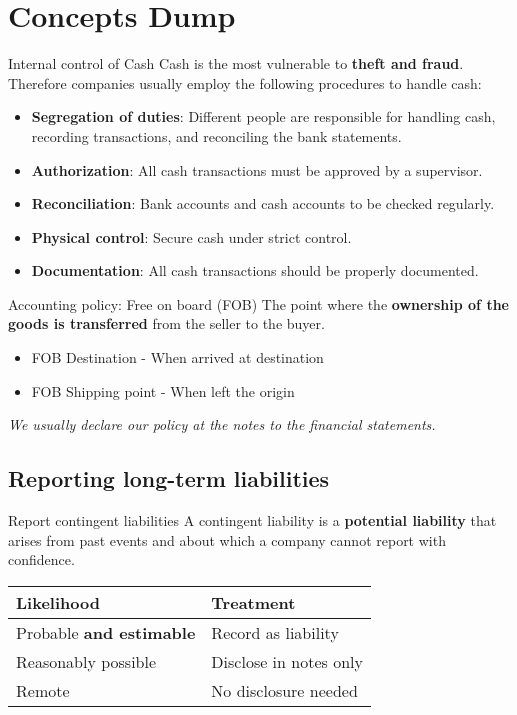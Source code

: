 \section{Concepts Dump}

\begin{theorem}
    {Internal control of Cash}
    Cash is the most vulnerable to \textbf{theft and fraud}. Therefore companies usually employ the following procedures to handle cash:
    \begin{itemize}
        \item \textbf{Segregation of duties}: Different people are responsible for handling cash, recording transactions, and reconciling the bank statements.
        \item \textbf{Authorization}: All cash transactions must be approved by a supervisor.
        \item \textbf{Reconciliation}: Bank accounts and cash accounts to be checked regularly.
        \item \textbf{Physical control}: Secure cash under strict control.
        \item \textbf{Documentation}: All cash transactions should be properly documented.
    \end{itemize}
\end{theorem}

\begin{theorem}
    {Accounting policy: Free on board (FOB)}
    The point where the \textbf{ownership of the goods is transferred} from the seller to the buyer.
    \begin{itemize}
        \item FOB Destination - When arrived at destination
        \item FOB Shipping point - When left the origin
    \end{itemize}
    \textit{We usually declare our policy at the notes to the financial statements.}
\end{theorem}

\subsection{Reporting long-term liabilities}

\begin{theorem}
    {Report contingent liabilities}
    A contingent liability is a \textbf{potential liability} that arises from past events and about which a company cannot report with confidence.

    \begin{tabular}{|p{}|p{}|}
        \hline
        \textbf{Likelihood}             & \textbf{Treatment}     \\
        \hline
        Probable \textbf{and estimable} & Record as liability    \\
        \hline
        Reasonably possible             & Disclose in notes only \\
        \hline
        Remote                          & No disclosure needed   \\
        \hline
    \end{tabular}
\end{theorem}

